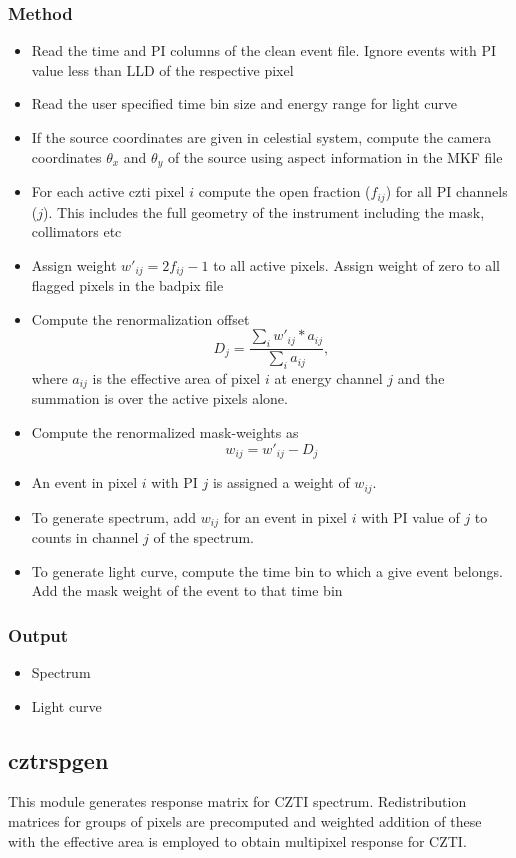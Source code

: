 \documentclass[11pt,oneside,a4paper]{article}
\begin{document}
\subsubsection*{Method}
\begin{itemize}
\item{Read the time and PI columns of the clean event file. Ignore events with PI value less than LLD of the
respective pixel}
\item{Read the user specified time bin size and energy range for light curve}
\item{If the source coordinates are given in celestial system, compute the 
camera coordinates $\theta_x$ and $\theta_y$ of the source using aspect information in the MKF file}
\item{For each active czti pixel $i$ compute the open fraction ($f_{ij}$) for all PI channels ($j$). This 
includes the full geometry of the instrument including the mask, collimators etc}
\item{Assign weight $w'_{ij} = 2f_{ij}-1$ to all active pixels. Assign weight of 
zero to all flagged pixels in the badpix file}
\item{Compute the renormalization offset $$D_{j} = \frac{\sum_{i} w'_{ij}*a_{ij}} {\sum_{i}a_{ij}},$$ where $a_{ij}$ is the effective
area of pixel $i$ at energy channel $j$ and the summation is over the active pixels alone.}
\item{Compute the renormalized mask-weights as $$ w_{ij} = w'_{ij} -D_{j}$$ }
\item{An event in pixel $i$ with PI $j$ is assigned a weight of $ w_{ij}$.}
\item{To generate spectrum, add $w_{ij}$ for an event in pixel $i$ with PI value of $j$ to 
counts in channel $j$ of the spectrum.}
\item{To generate light curve, compute the time bin to which a give event belongs. Add the 
mask weight of the event to that time bin} 
\end{itemize}
\subsubsection*{Output}
\begin{itemize}
\item{Spectrum}
\item{Light curve}
\end{itemize}


\subsection{cztrspgen}
This module generates response matrix for CZTI spectrum. Redistribution matrices 
for groups of pixels are precomputed and weighted addition of these with the 
effective area is employed to obtain multipixel response for CZTI. 
\end{document}
